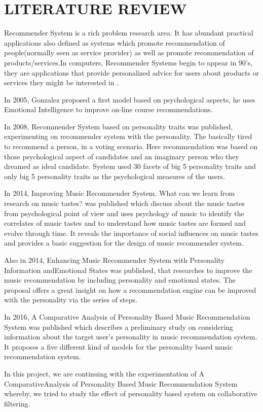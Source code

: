 \newpage
\section{LITERATURE REVIEW}
Recommender System is a rich problem research area. It has abundant practical applications also defined as systems which promote recommendation of people(normally seen as service provider) as well as promote recommendation of products/services.In computers, Recommender Systems begin to appear in 90's, they are applications that provide personalized advice for users about products or services they might be interested in \cite{resnick}.

In 2005, Gonzalez \cite{gonzalez} proposed a first model based on psychological aspects, he uses Emotional Intelligence to improve on-line course recommendations.

In 2008, Recommender System based on personality traits \cite{nunes} was published, experimenting on recommender system with the personality. The basically tired to recommend a person, in a voting scenario. Here recommendation was based on those psychological aspect of candidates and an imaginary person who they dreamed as ideal candidate. System used 30 facets of big 5 personality traits and only big 5 personality traits as the psychological measures of the users.

In 2014, Improving Music Recommender System. What can we learn from research on music tastes? \cite{laplante} was published which discuss about the music tastes from psychological point of view and uses psychology of music to identify the correlates of music tastes and to understand how music tastes are formed and evolve through time. It reveals the importance of social influences on music tastes and provides a basic suggestion for the design of music recommender system.

Also in 2014, Enhancing Music Recommender System with Personality Information andEmotional States \cite{bruce} was published, that researches to improve the music recommendation by including personality and emotional states. The proposal offers a great insight on how a recommendation engine can be improved with the personality via the series of steps.

In 2016, A Comparative Analysis of Personality Based Music Recommendation System \cite{melissa} was published which describes a preliminary study on considering information about the target user's personality in music recommendation system. It proposes a five different kind of models for the personality based music recommendation system.

In this project, we are continuing with the experimentation of A ComparativeAnalysis of Personality Based Music Recommendation System whereby, we tried to study the effect of personality based system on collaborative filtering.
